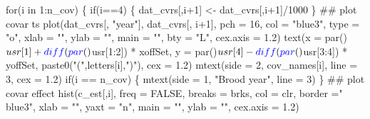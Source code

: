 \documentclass[
  11pt,
]{article}
\newenvironment{Shaded}{}{}
\newcommand{\CommentTok}[1]{\textcolor[rgb]{0.00,0.50,0.00}{#1}}
\newcommand{\ControlFlowTok}[1]{\textcolor[rgb]{0.00,0.00,1.00}{#1}}
\newcommand{\DataTypeTok}[1]{#1}
\newcommand{\DecValTok}[1]{#1}
\newcommand{\FloatTok}[1]{#1}
\newcommand{\KeywordTok}[1]{\textcolor[rgb]{0.00,0.00,1.00}{#1}}
\newcommand{\NormalTok}[1]{#1}
\newcommand{\OperatorTok}[1]{#1}
\newcommand{\OtherTok}[1]{\textcolor[rgb]{1.00,0.25,0.00}{#1}}
\newcommand{\StringTok}[1]{\textcolor[rgb]{0.00,0.50,0.50}{#1}}
\begin{document}
\begin{Shaded}
\begin{Highlighting}[]
\ControlFlowTok{for}\NormalTok{(i }\ControlFlowTok{in} \DecValTok{1}\OperatorTok{:}\NormalTok{n_cov) \{}
  \ControlFlowTok{if}\NormalTok{(i}\OperatorTok{==}\DecValTok{4}\NormalTok{) \{}
\NormalTok{    dat_cvrs[,i}\OperatorTok{+}\DecValTok{1}\NormalTok{] <-}\StringTok{ }\NormalTok{dat_cvrs[,i}\OperatorTok{+}\DecValTok{1}\NormalTok{]}\OperatorTok{/}\DecValTok{1000}
\NormalTok{  \}}
  \CommentTok{## plot covar ts}
  \KeywordTok{plot}\NormalTok{(dat_cvrs[, }\StringTok{"year"}\NormalTok{], dat_cvrs[, i}\OperatorTok{+}\DecValTok{1}\NormalTok{],}
       \DataTypeTok{pch =} \DecValTok{16}\NormalTok{, }\DataTypeTok{col =} \StringTok{"blue3"}\NormalTok{, }\DataTypeTok{type =} \StringTok{"o"}\NormalTok{,}
       \DataTypeTok{xlab =} \StringTok{""}\NormalTok{, }\DataTypeTok{ylab =} \StringTok{""}\NormalTok{, }\DataTypeTok{main =} \StringTok{""}\NormalTok{, }\DataTypeTok{bty =} \StringTok{"L"}\NormalTok{,}
       \DataTypeTok{cex.axis =} \FloatTok{1.2}\NormalTok{)}
  \KeywordTok{text}\NormalTok{(}\DataTypeTok{x =} \KeywordTok{par}\NormalTok{()}\OperatorTok{$}\NormalTok{usr[}\DecValTok{1}\NormalTok{] }\OperatorTok{+}\StringTok{ }\KeywordTok{diff}\NormalTok{(}\KeywordTok{par}\NormalTok{()}\OperatorTok{$}\NormalTok{usr[}\DecValTok{1}\OperatorTok{:}\DecValTok{2}\NormalTok{]) }\OperatorTok{*}\StringTok{ }\NormalTok{xoffSet,}
       \DataTypeTok{y =} \KeywordTok{par}\NormalTok{()}\OperatorTok{$}\NormalTok{usr[}\DecValTok{4}\NormalTok{] }\OperatorTok{-}\StringTok{ }\KeywordTok{diff}\NormalTok{(}\KeywordTok{par}\NormalTok{()}\OperatorTok{$}\NormalTok{usr[}\DecValTok{3}\OperatorTok{:}\DecValTok{4}\NormalTok{]) }\OperatorTok{*}\StringTok{ }\NormalTok{yoffSet,}
       \KeywordTok{paste0}\NormalTok{(}\StringTok{"("}\NormalTok{,letters[i],}\StringTok{")"}\NormalTok{),}
       \DataTypeTok{cex =} \FloatTok{1.2}\NormalTok{)}
  \KeywordTok{mtext}\NormalTok{(}\DataTypeTok{side =} \DecValTok{2}\NormalTok{, cov_names[i], }\DataTypeTok{line =} \DecValTok{3}\NormalTok{, }\DataTypeTok{cex =} \FloatTok{1.2}\NormalTok{)}
  \ControlFlowTok{if}\NormalTok{(i }\OperatorTok{==}\StringTok{ }\NormalTok{n_cov) \{}
    \KeywordTok{mtext}\NormalTok{(}\DataTypeTok{side =} \DecValTok{1}\NormalTok{, }\StringTok{"Brood year"}\NormalTok{, }\DataTypeTok{line =} \DecValTok{3}\NormalTok{)}
\NormalTok{  \}}
  \CommentTok{## plot covar effect}
  \KeywordTok{hist}\NormalTok{(c_est[,i],}
       \DataTypeTok{freq =} \OtherTok{FALSE}\NormalTok{, }\DataTypeTok{breaks =}\NormalTok{ brks, }\DataTypeTok{col =}\NormalTok{ clr, }\DataTypeTok{border =}\StringTok{" blue3"}\NormalTok{,}
       \DataTypeTok{xlab =} \StringTok{""}\NormalTok{, }\DataTypeTok{yaxt =} \StringTok{"n"}\NormalTok{, }\DataTypeTok{main =} \StringTok{""}\NormalTok{, }\DataTypeTok{ylab =} \StringTok{""}\NormalTok{, }\DataTypeTok{cex.axis =} \FloatTok{1.2}\NormalTok{)}

\end{Highlighting}
\end{Shaded}
\end{document}
